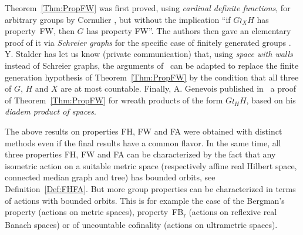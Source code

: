 \documentclass[a4paper]{article}
\theoremstyle{definition}
\newcommand*{\FB}{FB\textsubscript{r}}
\newcommand*{\FH}{FH}
\newcommand*{\FW}{FW}
\newcommand*{\FA}{FA}
\begin{document}
Theorem~\ref{Thm:PropFW} was first proved, using \emph{cardinal definite functions}, for arbitrary groups by Cornulier \cite{Cornulier2013}, but without the implication ``if $G \wr_X H$ has property~\FW, then $G$ has property \FW''.
The authors then gave an elementary proof of it via \emph{Schreier graphs} for the specific case of finitely generated groups \cite{LS2020}.
Y. Stalder has let us know (private communication) that, using \emph{space with walls} instead of Schreier graphs, the arguments of~\cite{LS2020} can be adapted to replace the finite generation hypothesis of Theorem~\ref{Thm:PropFW} by the condition that all three of $G$, $H$ and $X$ are at most countable.
Finally, A. Genevois published in~\cite{2017arXiv170500834G} a proof of Theorem~\ref{Thm:PropFW} for wreath products of the form $G\wr_HH$, based on his \emph{diadem product of spaces}.

The above results on properties \FH, \FW{} and \FA{} were obtained with distinct methods even if the final results have a common flavor.
In the same time, all three properties \FH, \FW{}  and \FA{} can be characterized by the fact that any isometric action on a suitable metric space (respectively affine real Hilbert space, connected median graph and tree) has bounded orbits, see Definition~\ref{Def:FHFA}.
But more group properties can be characterized in terms of actions with bounded orbits.
This is for example the case of the Bergman's property (actions on metric spaces), property~\FB{} (actions on reflexive real Banach spaces) or of uncountable cofinality (actions on ultrametric spaces).
\end{document}
